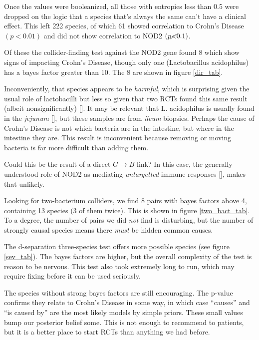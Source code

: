 \documentclass[letterpaper]{article}
\begin{document}
Once the values were booleanized, all those with
entropies less than 0.5 were dropped on the logic that a species
that's always the same can't have a clinical effect.  This left 222
species, of which 61 showed correlation to Crohn's Disease $(p<0.01)$
and did not show correlation to NOD2 $(p\cancel{<}0.1)$.

Of these the collider-finding test against the NOD2 gene found 8 which
show signs of impacting
Crohn's Disease, though only one (Lactobacillus acidophilus) has a
bayes factor greater than 10.  The 8 are shown in figure \ref{dir_tab}.

Inconveniently, that species appears to
be \textit{harmful}, which is surprising given the usual role of
lactobacilli but less so given that two RCTs found this same result
(albeit nonsignificantly) [\cite{lgg1,lgg2}].  It may be relevant that
L. acidophilus is usually found in the
\textit{jejunum} [\cite{lacid}], but these samples are from
\textit{ileum} biopsies.  Perhaps the cause of Crohn's Disease is not
which bacteria are in the intestine, but where in the intestine they
are.  This result is inconvenient because removing or moving bacteria
is far more difficult than adding them.

Could this be the result of a direct $G\rightarrow B$ link?  In this
case, the generally
understood role of NOD2 as mediating \textit{untargetted} immune
responses [\cite{nod2}], makes that unlikely.

Looking for two-bacterium colliders, we find 8 pairs with bayes
factors above 4, containing 13 species (3 of them twice).  This is
shown in figure \ref{two_bact_tab}.  To a degree, the number of pairs
we did \textit{not} find is disturbing, but the number of strongly
causal species means there \textit{must} be hidden common causes.

The d-separation three-species test offers more possible species (see figure
\ref{sev_tab}).  The bayes factors are higher, but the overall
complexity of the test is reason to be nervous.  This test also took
extremely long to run, which may require fixing before it can be used
seriously.

The species without strong bayes factors are still encouraging.  The
p-value confirms they relate to Crohn's Disease in some way, in which
case ``causes'' and ``is caused by'' are the most likely models by
simple priors.  These small values bump our posterior belief some.
This is not enough to recommend to patients, but it is a better place
to start RCTs than anything we had before.
\end{document}
